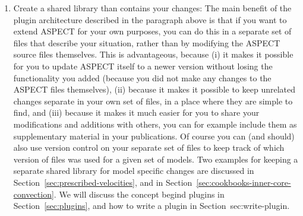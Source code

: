 \documentclass{article}
\newcommand{\aspect}{\textsc{ASPECT}}
\begin{document}
\begin{enumerate}
\item Create a shared library than contains your changes: The main benefit of
the plugin architecture described in the paragraph above is that if you want to
extend \aspect{} for your own purposes, you can do this in a separate set of
files that describe your situation, rather than by modifying the \aspect{}
source files themselves. This is advantageous, because (i) it makes it possible
for you to update \aspect{} itself to a newer version without losing the
functionality you added (because you did not make any changes to the \aspect{}
files themselves), (ii) because it makes it possible to keep unrelated changes
separate in your own set of files, in a place where they are simple to find,
and (iii) because it makes it much easier for you to share your modifications
and additions with others, you can for example include them as supplementary
material in your publications. Of course you can (and should) also use version
control on your separate set of files to keep track of which version of files
was used for a given set of models. Two examples for keeping a separate shared
library for model specific changes are discussed in
Section~\ref{sec:prescribed-velocities}, and in
Section~\ref{sec:cookbooks-inner-core-convection}. We will discuss the concept
begind plugins in Section~\ref{sec:plugins}, and how to write a plugin in
Section~{sec:write-plugin}.
\end{enumerate}
\end{document}

